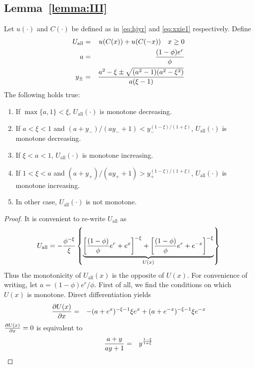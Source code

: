 \begin{subappendices}
\section{Lemma~\ref{lemma:III}}
\setcounter{equation}{0}
\begin{lemma}\label{lemma:III}
Let $u(\cdot)$  and $C(\cdot)$ be defined as in \eqref{eq:hjyr} and
\eqref{eq:xxie1} respectively. Define
\begin{eqnarray*}
U_{\text{all}} &=& u(C(x))
+ u(C(-x))
\quad
x \geq 0 \\
a &=& {
  (1 - \phi) e^r
  \over
  \phi
} \\
y_\pm &=& {
  a^2 - \xi \pm \sqrt{(a^2 - 1) (a^2 - \xi^2)}
  \over
  a (\xi - 1)
}
\end{eqnarray*}
The following holds true:
\begin{enumerate}
\item If $\max\{a, 1\} < \xi$, $U_{\text{all}}(\cdot)$ is
  monotone decreasing.
\item If $a < \xi < 1$ and $(a + y_-)/(a y_- + 1) <
  y_-^{(1-\xi)/(1+\xi)}$, $U_{\text{all}}(\cdot)$ is monotone
  decreasing.
\item If $\xi < a < 1$, $U_{\text{all}}(\cdot)$ is monotone
  increasing.
\item If $1 < \xi < a$ and $(a + y_+)/(a y_+ + 1) >
  y_+^{(1-\xi)/(1+\xi)}$, $U_{\text{all}}(\cdot)$ is monotone
  increasing.
\item In other case, $U_{\text{all}}(\cdot)$ is not monotone.
\end{enumerate}
\end{lemma}
\begin{proof}
  It is convenient to re-write $U_{\text{all}}$ as
  \[
  U_{\text{all}} =
  -{\phi^{-\xi} \over \xi} \left\{
    \underbrace{
      \left[{(1 - \phi) \over \phi} e^r + e^x\right]^{-\xi}
      +
      \left[{(1 - \phi) \over \phi} e^r + e^{-x}\right]^{-\xi}
    }_{U(x)}
  \right\}
  \]
  Thus the monotonicity of $U_{\text{all}}(x)$ is the opposite of $U(x)$. For
  convenience of writing, let $a = (1 - \phi)e^r/\phi$.
  First of all, we find the conditions on which $U(x)$ is monotone.
  Direct differentiation yields
  \begin{eqnarray*}
    {\partial U(x) \over \partial x}
    &=&
    -{
      (a + e^x)^{-\xi - 1} \xi e^x
    } + (a + e^{-x})^{-\xi - 1} \xi e^{-x}
  \end{eqnarray*}
  ${\partial U(x) \over \partial x} = 0$ is equivalent to
  \begin{eqnarray*}
    {a + y \over a y + 1} &=& y^{1 -\xi \over 1+\xi} \\

\end{eqnarray*}
\end{proof}
\end{subappendices}
